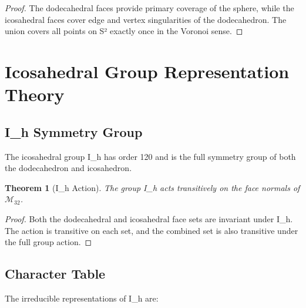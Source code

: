 \documentclass{article}
\newtheorem{theorem}{Theorem}
\theoremstyle{remark}
\begin{document}
\begin{proof}
The dodecahedral faces provide primary coverage of the sphere, while the icosahedral faces cover edge and vertex singularities of the dodecahedron. The union covers all points on S² exactly once in the Voronoi sense.
\end{proof}

\section{Icosahedral Group Representation Theory}

\subsection{I_h Symmetry Group}

The icosahedral group I_h has order 120 and is the full symmetry group of both the dodecahedron and icosahedron.

\begin{theorem}[I_h Action]
The group I_h acts transitively on the face normals of $\mathcal{M}_{32}$.
\end{theorem}

\begin{proof}
Both the dodecahedral and icosahedral face sets are invariant under I_h. The action is transitive on each set, and the combined set is also transitive under the full group action.
\end{proof}

\subsection{Character Table}

The irreducible representations of I_h are:
\end{document}
